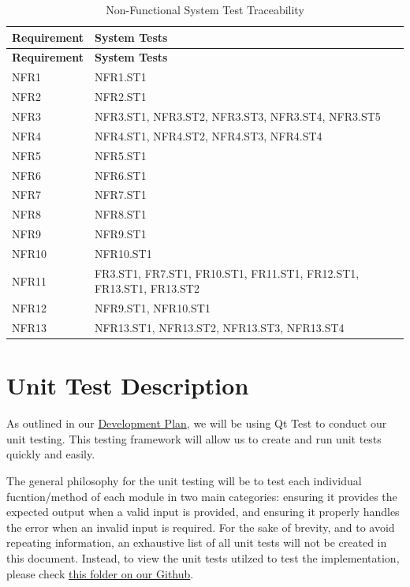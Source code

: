 \documentclass[12pt, titlepage]{article}
\begin{document}
\begin{longtable}[H]{|p{} | p{}|}
  \caption{Non-Functional System Test Traceability}
  \label{TblNFRSTTraceability}\\
  \hline
  \textbf{Requirement} & \textbf{System Tests}\\
  \hline
  \endfirsthead
  \hline
  \textbf{Requirement} & \textbf{System Tests}\\
  \hline
  \endhead
  NFR1 & NFR1.ST1\\
  \hline
  NFR2 & NFR2.ST1\\
  \hline
  NFR3 & NFR3.ST1, NFR3.ST2, NFR3.ST3, NFR3.ST4, NFR3.ST5\\
  \hline
  NFR4 & NFR4.ST1, NFR4.ST2, NFR4.ST3, NFR4.ST4\\
  \hline
  NFR5 & NFR5.ST1\\
  \hline
  NFR6 & NFR6.ST1\\
  \hline
  NFR7 & NFR7.ST1\\
  \hline
  NFR8 & NFR8.ST1\\
  \hline
  NFR9 & NFR9.ST1\\
  \hline
  NFR10 & NFR10.ST1\\
  \hline
  NFR11 & FR3.ST1, FR7.ST1, FR10.ST1, FR11.ST1, FR12.ST1, FR13.ST1, FR13.ST2\\
  \hline
  NFR12 & NFR9.ST1, NFR10.ST1\\
  \hline
  NFR13 & NFR13.ST1, NFR13.ST2, NFR13.ST3, NFR13.ST4\\
  \hline
\end{longtable}


\section{Unit Test Description}

As outlined in our \href{https://github.com/agentvv/MTOBridge/blob/main/docs/DevelopmentPlan/DevelopmentPlan.pdf}{Development Plan}, we will be using Qt Test
to conduct our unit testing. This testing framework will allow us to create and run unit tests quickly and easily.

The general philosophy for the unit testing will be to test each individual fucntion/method of each module in two main categories: ensuring it provides the expected output
when a valid input is provided, and ensuring it properly handles the error when an invalid input is required. For the sake of brevity, and to avoid repeating information,
an exhaustive list of all unit tests will not be created in this document. Instead, to view the unit tests utilzed to test the implementation, please check
\href{https://github.com/agentvv/MTOBridge/blob/main/test}{this folder on our Github}.
\end{document}
